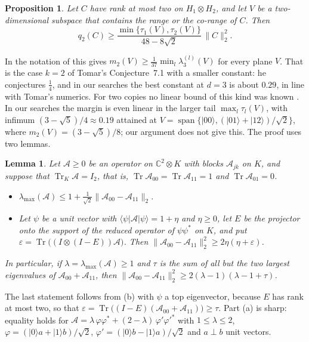 \documentclass[11pt]{article}
\newtheorem{lemma}[theorem]{Lemma}
\newtheorem{proposition}[theorem]{Proposition}
\theoremstyle{remark}
\newcommand{\Tr}{\operatorname{Tr}}
\newcommand{\norm}[1]{\lVert #1\rVert}
\begin{document}
\begin{proposition}\label{prop:thick}
Let $C$ have rank at most two on $H_1\otimes H_2$, and let $V$ be a two-dimensional subspace that contains the range or
the co-range of $C$. Then
\[
q_2(C)\ge\frac{\min\{\tau_1(V),\tau_2(V)\}}{48-8\sqrt2}\,\norm{C}_2^2 .
\]
\end{proposition}

In the notation of \cite{Tomar2} this gives $m_2(V)\ge\frac1{37}\min_l\lambda_3^{(l)}(V)$ for every plane $V$. That is
the case $k=2$ of Tomar's Conjecture~7.1 with a smaller constant: he conjectures $\frac14$, and in our searches the
best constant at $d=3$ is about $0.29$, in line with Tomar's numerics. For two copies no linear bound of this kind was known
\cite[Sec.~8]{Tomar2}. In our searches the margin is even linear in the larger tail $\max_l\tau_l(V)$, with infimum
$(3-\sqrt5)/4\approx0.19$ attained at $V=\operatorname{span}\{|00\rangle,(|01\rangle+|12\rangle)/\sqrt2\}$, where
$m_2(V)=(3-\sqrt5)/8$; our argument does not give this. The proof uses two lemmas.

\begin{lemma}\label{lem:qubit}
Let $\mathcal A\ge0$ be an operator on $\mathbb C^2\otimes K$ with blocks $\mathcal A_{jk}$ on $K$, and suppose that
$\Tr_K\mathcal A=I_2$, that is, $\Tr\mathcal A_{00}=\Tr\mathcal A_{11}=1$ and $\Tr\mathcal A_{01}=0$.
\begin{itemize}
\item[(a)] $\lambda_{\max}(\mathcal A)\le1+\tfrac1{\sqrt2}\norm{\mathcal A_{00}-\mathcal A_{11}}_2$.
\item[(b)] Let $\psi$ be a unit vector with $\langle\psi|\mathcal A|\psi\rangle=1+\eta$ and $\eta\ge0$, let $E$ be the
projector onto the support of the reduced operator of $\psi\psi^*$ on $K$, and put
$\varepsilon=\Tr\big((I\otimes(I-E))\mathcal A\big)$. Then
$\norm{\mathcal A_{00}-\mathcal A_{11}}_2^2\ge2\eta(\eta+\varepsilon)$.
\end{itemize}
In particular, if $\lambda=\lambda_{\max}(\mathcal A)\ge1$ and $\tau$ is the sum of all but the two largest eigenvalues
of $\mathcal A_{00}+\mathcal A_{11}$, then $\norm{\mathcal A_{00}-\mathcal A_{11}}_2^2\ge2(\lambda-1)(\lambda-1+\tau)$.
\end{lemma}

The last statement follows from (b) with $\psi$ a top eigenvector, because $E$ has rank at most two, so that
$\varepsilon=\Tr\big((I-E)(\mathcal A_{00}+\mathcal A_{11})\big)\ge\tau$. Part (a) is sharp: equality holds for
$\mathcal A=\lambda\,\varphi\varphi^*+(2-\lambda)\,\varphi'\varphi'^*$ with
$1\le\lambda\le2$, $\varphi=(|0\rangle a+|1\rangle b)/\sqrt2$, $\varphi'=(|0\rangle b-|1\rangle a)/\sqrt2$ and $a\perp b$
unit vectors.
\end{document}
